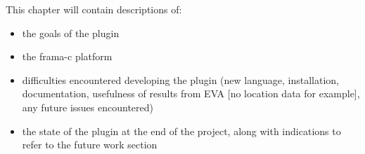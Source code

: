 This chapter will contain descriptions of:

\begin{itemize}
	\item the goals of the plugin
	\item the frama-c platform
	\item difficulties encountered developing the plugin (new language, installation, documentation, usefulness of results from EVA [no location data for example], any future issues encountered)
	\item the state of the plugin at the end of the project, along with indications to refer to the future work section
\end{itemize}
